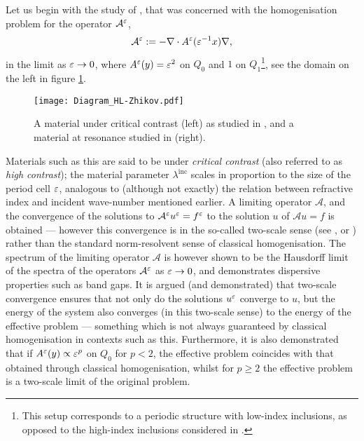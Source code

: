 Let us begin with the study of \cite{zhikov2000extension}, that was concerned with the homogenisation problem for the operator $\mathcal{A}^{\varepsilon}$,
\begin{align*}
	\mathcal{A}^{\varepsilon} := -\nabla\cdot A^{\varepsilon}(\varepsilon^{-1}x)\nabla,
\end{align*}
in the limit as $\varepsilon\rightarrow0$, where $A^{\varepsilon}(y)=\varepsilon^2$ on $Q_0$ and $1$ on $Q_1$\footnote{This setup corresponds to a periodic structure with low-index inclusions, as opposed to the high-index inclusions considered in \cite{movchan2001noncommuting}.}, see the domain on the left in figure \ref{fig:Diagram_HL-Zhikov}.
\begin{figure}[b]
	\centering
	\texttt{[image: Diagram\_HL-Zhikov.pdf]}
	\caption[Relation between materials under critical contrast and at resonance.]{\label{fig:Diagram_HL-Zhikov} A material under critical contrast (left) as studied in \cite{zhikov2000extension}, and a material at resonance studied in \cite{hempel2000spectral} (right).}
\end{figure}
Materials such as this are said to be under \emph{critical contrast} (also referred to as \emph{high contrast}); the material parameter $\lambda^{\mathrm{inc}}$ scales in proportion to the size of the period cell $\varepsilon$, analogous to (although not exactly) the relation between refractive index and incident wave-number mentioned earlier.
A limiting operator $\mathcal{A}$, and the convergence of the solutions to $\mathcal{A}^{\varepsilon}u^{\varepsilon}=f^{\varepsilon}$ to the solution $u$ of $\mathcal{A}u=f$ is obtained --- however this convergence is in the so-called two-scale sense (see \cite[section 2]{zhikov2000extension}, or \cite{bouchitte2001homogenization}) rather than the standard norm-resolvent sense of classical homogenisation.
The spectrum of the limiting operator $\mathcal{A}$ is however shown to be the Hausdorff limit of the spectra of the operators $\mathcal{A}^{\varepsilon}$ as $\varepsilon\rightarrow0$, and demonstrates dispersive properties such as band gaps.
It is argued (and demonstrated) that two-scale convergence ensures that not only do the solutions $u^{\varepsilon}$ converge to $u$, but the energy of the system also converges (in this two-scale sense) to the energy of the effective problem --- something which is not always guaranteed by classical homogenisation in contexts such as this.
Furthermore, it is also demonstrated that if $A^{\varepsilon}(y)\propto\varepsilon^p$ on $Q_0$ for $p<2$, the effective problem coincides with that obtained through classical homogenisation, whilst for $p\geq 2$ the effective problem is a two-scale limit of the original problem.
